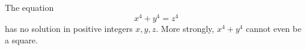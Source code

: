 The equation
$$x^4 + y^4 = z^4$$
has no solution in positive integers $x, y, z$. More strongly, $x^4 + y^4$ cannot even be a square.
